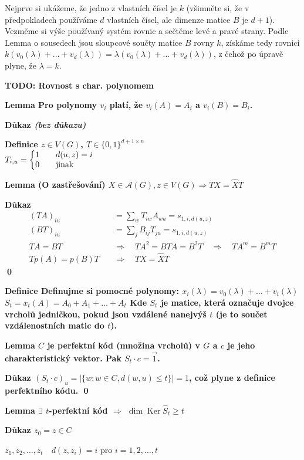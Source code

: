 \documentclass[a4paper,12pt,titlepage]{article}
\newcommand{\lm}{\smallskip\noindent\bf Lemma\rm{} }
\newcommand{\dk}{\smallskip\noindent\bf Důkaz\rm{} }
\newcommand{\df}{\smallskip\noindent\bf Definice\rm{} }
\newcommand{\A}{\mathcal{A}}
\newcommand{\todo}[1]{\bf TODO: \rm#1}
\DeclareMathOperator{\Ker}{Ker}
\begin{document}
Nejprve si ukážeme, že jedno z vlastních čísel je $k$ (všimněte si, že v předpokladech používáme $d$ vlastních čísel, ale dimenze matice $B$ je $d+1$). Vezměme si výše používaný systém rovnic a sečtěme levé a pravé strany. Podle Lemma o sousedech jsou sloupcové součty matice $B$ rovny $k$, získáme tedy rovnici $k(v_0(\lambda) + \ldots + v_d(\lambda)) = \lambda (v_0(\lambda) + \ldots + v_d(\lambda))$, z čehož po úpravě plyne, že $\lambda = k$.

\todo{Rovnost s char. polynomem}

\lm Pro polynomy $v_i$ platí, že $v_i(A) = A_i$ a $v_i(B) = B_i$.

\dk {\it(bez důkazu)}


\df $z\in V(G)$, $T\in\{0,1\}^{d+1 \times n}$\\
\indent $T_{i,u} = \left\{\begin{matrix}
1\quad & d(u,z) = i\hfill \\
0\quad & \text{jinak}\hfill
\end{matrix}\right.$

\lm (O zastřešování) $X\in\A(G), z\in V(G) \Rightarrow TX = \widehat XT$

\dk 
\begin{align*}
(TA)_{iu} &= \sum_w T_{iw}A_{wu} = s_{1,i,d(u,z)} \\
(BT)_{iu} &= \sum_j B_{ij}T_{ju} = s_{1,i,d(u,z)} \\
TA = BT \quad&\Rightarrow\quad TA^2 = BTA = B^2T \quad\Rightarrow\quad TA^m = B^mT \\
Tp(A) = p(B)T \quad&\Rightarrow\quad TX = \widehat XT
\end{align*}
\qed

\df Definujme si pomocné polynomy: 
	$x_i(\lambda) = v_0(\lambda) + \dots + v_i(\lambda)$ \hfil $S_t = x_t(A) = A_0 + A_1 + \dots + A_t$
Kde $S_t$ je matice, která označuje dvojce vrcholů jedničkou, pokud jsou vzdálené nanejvýš $t$ (je to součet vzdálenostních matic do $t$).

\lm $C$ je perfektní kód (množina vrcholů) v $G$ a $c$ je jeho charakteristický vektor. Pak $S_t\cdot c = \vec 1$.

\dk $(S_t\cdot c)_u = |\{w: w\in C, d(w,u) \le t\}| = 1$, což plyne z definice perfektního kódu.
\qed

\lm $\exists$ $t$-perfektní kód $\Rightarrow$ $\dim \Ker \widehat S_t \ge t$

\dk $z_0 = z \in C$

$z_1,z_2,\dots,z_t \quad d(z,z_i) = i$ pro $i = 1,2,\dots,t$
\end{document}
